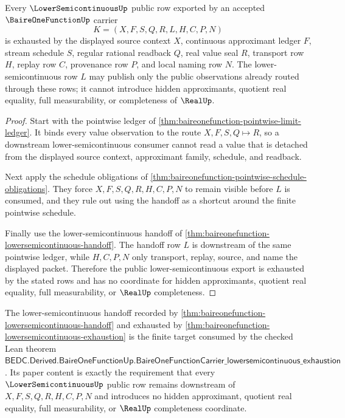 \begin{theorem}
\label{thm:baireonefunction-lowersemicontinuous-exhaustion}
Every $\LowerSemicontinuousUp$ public row exported by an accepted $\BaireOneFunctionUp$ carrier
$$
K=(X,F,S,Q,R,L,H,C,P,N)
$$
is exhausted by the displayed source context $X$, continuous approximant ledger $F$, stream schedule $S$, regular rational readback $Q$, real value seal $R$, transport row $H$, replay row $C$, provenance row $P$, and local naming row $N$. The lower-semicontinuous row $L$ may publish only the public observations already routed through these rows; it cannot introduce hidden approximants, quotient real equality, full measurability, or completeness of $\RealUp$.
\end{theorem}
\begin{proof}
Start with the pointwise ledger of \autoref{thm:baireonefunction-pointwise-limit-ledger}. It binds every value observation to the route $X,F,S,Q\longmapsto R$, so a downstream lower-semicontinuous consumer cannot read a value that is detached from the displayed source context, approximant family, schedule, and readback.

Next apply the schedule obligations of \autoref{thm:baireonefunction-pointwise-schedule-obligations}. They force $X,F,S,Q,R,H,C,P,N$ to remain visible before $L$ is consumed, and they rule out using the handoff as a shortcut around the finite pointwise schedule.

Finally use the lower-semicontinuous handoff of \autoref{thm:baireonefunction-lowersemicontinuous-handoff}. The handoff row $L$ is downstream of the same pointwise ledger, while $H,C,P,N$ only transport, replay, source, and name the displayed packet. Therefore the public lower-semicontinuous export is exhausted by the stated rows and has no coordinate for hidden approximants, quotient real equality, full measurability, or $\RealUp$ completeness.
\end{proof}

\begin{theorem}
\label{thm:baireonefunction-formal-target-handoff}
The lower-semicontinuous handoff recorded by \autoref{thm:baireonefunction-lowersemicontinuous-handoff} and exhausted by \autoref{thm:baireonefunction-lowersemicontinuous-exhaustion} is the finite target consumed by the checked Lean theorem
$\mathsf{BEDC.Derived.BaireOneFunctionUp.BaireOneFunctionCarrier\_lowersemicontinuous\_exhaustion}$. Its paper content is exactly the requirement that every $\LowerSemicontinuousUp$ public row remains downstream of $X,F,S,Q,R,H,C,P,N$ and introduces no hidden approximant, quotient real equality, full measurability, or $\RealUp$ completeness coordinate.
\end{theorem}

